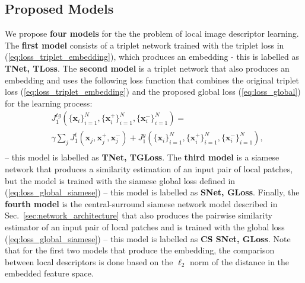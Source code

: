 \documentclass[10pt,twocolumn,letterpaper]{article}
\begin{document}
\subsection{Proposed Models}
\label{sec:proposed_models}

We propose {\bf four models} for the the problem of local image descriptor learning.  
The {\bf first model} consists of a triplet network trained with the triplet loss in (\ref{eq:loss_triplet_embedding}), which produces an embedding - this is labelled as {\bf TNet, TLoss}.
The {\bf second model} is a triplet network that also produces an embedding and uses the following loss function that combines the original triplet loss (\ref{eq:loss_triplet_embedding}) and the proposed global loss (\ref{eq:loss_global}) for the learning process:
\begin{equation}
\begin{split}
 &J_1^{tg}( \{ \mathbf{x}_i \}_{i=1}^N , \{ \mathbf{x}_i^+ \}_{i=1}^N, \{ \mathbf{x}_i^-\}_{i=1}^N ) = \\
 & \gamma \sum_j J_1^t ( \mathbf{x}_j,\mathbf{x}_j^+, \mathbf{x}_j^-)   +  J_1^g( \{ \mathbf{x}_i \}_{i=1}^N , \{ \mathbf{x}_i^+ \}_{i=1}^N, \{ \mathbf{x}_i^-\}_{i=1}^N ),\\
\end{split}
\label{eq:loss_combined}
\end{equation}
-- this model is labelled as {\bf TNet, TGLoss}.
The {\bf third model} is a siamese network that produces a similarity estimation of an input pair of local patches, but the model is trained with the siamese global loss defined in (\ref{eq:loss_global_siamese}) -- this model is labelled as {\bf SNet, GLoss}.  Finally, the {\bf fourth model} is the central-surround siamese network model described in Sec.~\ref{sec:network_architecture}  that also produces the pairwise similarity estimator of an input pair of local patches and is trained with the global loss (\ref{eq:loss_global_siamese}) -- this model is labelled as {\bf CS SNet, GLoss}.  
Note that for the first two models that produce the embedding, the comparison between local descriptors is done based on the $\ell_2$ norm of the distance in the embedded feature space.
\end{document}
